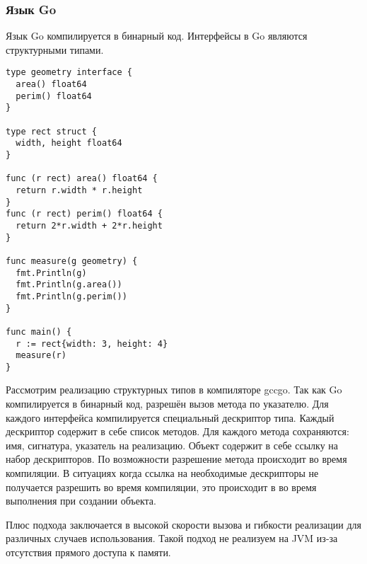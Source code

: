\subsubsection{Язык Go}
Язык Go компилируется в бинарный код. Интерфейсы в Go являются структурными типами\cite{go}.

\begin{verbatim}
type geometry interface {
  area() float64
  perim() float64
}

type rect struct {
  width, height float64
}

func (r rect) area() float64 {
  return r.width * r.height
}
func (r rect) perim() float64 {
  return 2*r.width + 2*r.height
}

func measure(g geometry) {
  fmt.Println(g)
  fmt.Println(g.area())
  fmt.Println(g.perim())
}

func main() {
  r := rect{width: 3, height: 4}
  measure(r)
}
\end{verbatim}

Рассмотрим реализацию структурных типов в компиляторе gccgo. Так как Go компилируется в бинарный код, разрешён вызов метода по указателю. Для каждого интерфейса компилируется специальный дескриптор типа. Каждый дескриптор содержит в себе список методов. Для каждого метода сохраняются: имя, сигнатура, указатель на реализацию. Объект содержит в себе ссылку на набор дескрипторов. По возможности разрешение метода происходит во время компиляции. В ситуациях когда ссылка на необходимые дескрипторы не получается разрешить во время компиляции, это происходит в во время выполнения при создании объекта.

Плюс подхода заключается в высокой скорости вызова и гибкости реализации для различных случаев использования. Такой подход не реализуем на JVM из-за отсутствия прямого доступа к памяти.